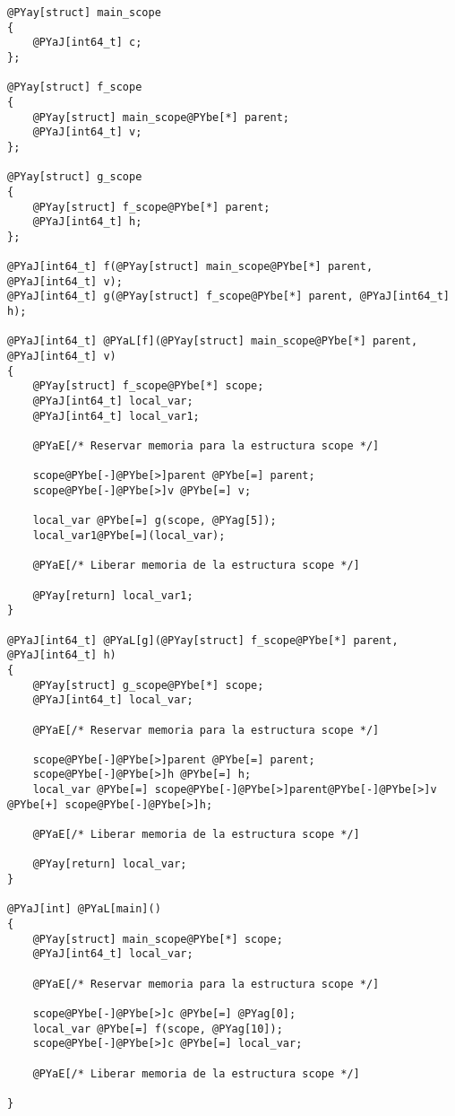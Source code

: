 \begin{Verbatim}[commandchars=@\[\]]
@PYay[struct] main_scope
{
    @PYaJ[int64_t] c;
};

@PYay[struct] f_scope
{
    @PYay[struct] main_scope@PYbe[*] parent;
    @PYaJ[int64_t] v;
};

@PYay[struct] g_scope
{
    @PYay[struct] f_scope@PYbe[*] parent;
    @PYaJ[int64_t] h;
};

@PYaJ[int64_t] f(@PYay[struct] main_scope@PYbe[*] parent, @PYaJ[int64_t] v);
@PYaJ[int64_t] g(@PYay[struct] f_scope@PYbe[*] parent, @PYaJ[int64_t] h);

@PYaJ[int64_t] @PYaL[f](@PYay[struct] main_scope@PYbe[*] parent, @PYaJ[int64_t] v)
{
    @PYay[struct] f_scope@PYbe[*] scope;
    @PYaJ[int64_t] local_var;
    @PYaJ[int64_t] local_var1;

    @PYaE[/* Reservar memoria para la estructura scope */]

    scope@PYbe[-]@PYbe[>]parent @PYbe[=] parent;
    scope@PYbe[-]@PYbe[>]v @PYbe[=] v;

    local_var @PYbe[=] g(scope, @PYag[5]);
    local_var1@PYbe[=](local_var);

    @PYaE[/* Liberar memoria de la estructura scope */]

    @PYay[return] local_var1;
}

@PYaJ[int64_t] @PYaL[g](@PYay[struct] f_scope@PYbe[*] parent, @PYaJ[int64_t] h)
{
    @PYay[struct] g_scope@PYbe[*] scope;
    @PYaJ[int64_t] local_var;

    @PYaE[/* Reservar memoria para la estructura scope */]

    scope@PYbe[-]@PYbe[>]parent @PYbe[=] parent;
    scope@PYbe[-]@PYbe[>]h @PYbe[=] h;
    local_var @PYbe[=] scope@PYbe[-]@PYbe[>]parent@PYbe[-]@PYbe[>]v @PYbe[+] scope@PYbe[-]@PYbe[>]h;

    @PYaE[/* Liberar memoria de la estructura scope */]

    @PYay[return] local_var;
}

@PYaJ[int] @PYaL[main]()
{
    @PYay[struct] main_scope@PYbe[*] scope;
    @PYaJ[int64_t] local_var;

    @PYaE[/* Reservar memoria para la estructura scope */]

    scope@PYbe[-]@PYbe[>]c @PYbe[=] @PYag[0];
    local_var @PYbe[=] f(scope, @PYag[10]);
    scope@PYbe[-]@PYbe[>]c @PYbe[=] local_var;

    @PYaE[/* Liberar memoria de la estructura scope */]

}
\end{Verbatim}
